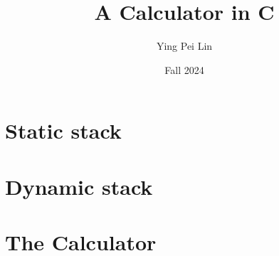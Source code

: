 \documentclass[a4paper,11pt]{article}
\begin{document}
\title{
    \textbf{A Calculator in C}
}
\author{Ying Pei Lin}
\date{Fall 2024}

\maketitle

\section*{Static stack}

\section*{Dynamic stack}

\section*{The Calculator}
\end{document}
